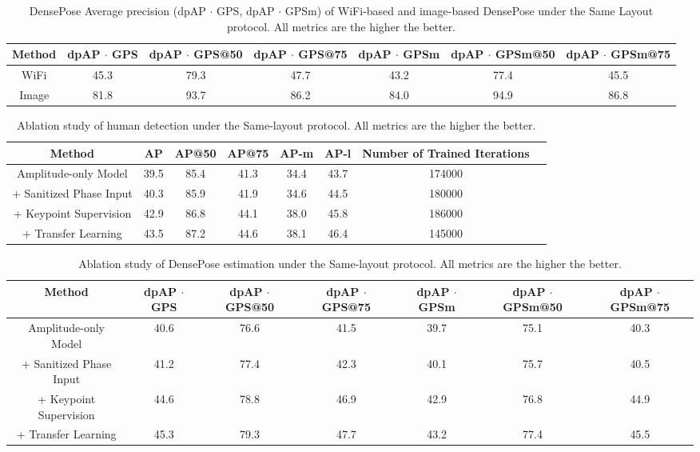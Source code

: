\documentclass[sigconf, anonymous=false]{acmart}
\begin{document}
\begin{table*}[!htb]
\begin{center}
\begin{tabular}{ |c|c|c|c|c|c|c| } 
 \hline
 Method & dpAP $\cdot$ GPS & dpAP $\cdot$ GPS@50 & dpAP $\cdot$ GPS@75 & dpAP $\cdot$ GPSm & dpAP $\cdot$ GPSm@50 & dpAP $\cdot$ GPSm@75 \\ 
 \hline
 WiFi &  45.3 & 79.3 & 47.7 & 43.2 & 77.4 & 45.5\\ \hline
 Image & 81.8 & 93.7 & 86.2 & 84.0 & 94.9 & 86.8\\
 \hline
\end{tabular}
\end{center}
\caption{DensePose Average precision (dpAP $\cdot$ GPS, dpAP $\cdot$ GPSm) of WiFi-based and image-based DensePose under the Same Layout protocol. All metrics are the higher the better.}
\label{tab:WiFi-Image-DP-AP}
\end{table*}

\begin{table*}[!htb]
\begin{center}
\begin{tabular}{ |c|c|c|c|c|c|c|c| } 
 \hline
 Method & AP & AP@50 & AP@75 & AP-m & AP-l & Number of Trained Iterations\\ 
 \hline
 Amplitude-only Model & 39.5 & 85.4 & 41.3 & 34.4 & 43.7 & 174000 \\
  \hline
 + Sanitized Phase Input & 40.3 & 85.9 & 41.9 & 34.6 & 44.5 & 180000 \\
 \hline
  + Keypoint Supervision & 42.9 & 86.8 & 44.1 &  38.0 & 45.8 & 186000 \\
 \hline
  + Transfer Learning & 43.5 & 87.2 & 44.6 & 38.1 & 46.4 & 145000\\ 
 \hline
\end{tabular}
\end{center}
\caption{Ablation study of human detection under the Same-layout protocol. All metrics are the higher the better.}
\label{tab:Ablation_1}
\end{table*}

\begin{table*}[!htb]
\begin{center}
\begin{tabular}{ |c|c|c|c|c|c|c| } 
 \hline
 Method & dpAP $\cdot$ GPS & dpAP $\cdot$ GPS@50 & dpAP $\cdot$ GPS@75 & dpAP $\cdot$ GPSm & dpAP $\cdot$ GPSm@50 & dpAP $\cdot$ GPSm@75\\ 
 \hline
 Amplitude-only Model & 40.6 & 76.6 & 41.5 & 39.7 & 75.1 & 40.3 \\
  \hline
 + Sanitized Phase Input & 41.2 & 77.4 & 42.3 & 40.1 & 75.7 & 40.5 \\
 \hline
  + Keypoint Supervision & 44.6 & 78.8 & 46.9 &  42.9 & 76.8 & 44.9 \\
 \hline
  + Transfer Learning & 45.3 & 79.3 & 47.7 & 43.2 & 77.4 & 45.5 \\ 
 \hline
\end{tabular}
\end{center}
\caption{Ablation study of DensePose estimation under the Same-layout protocol. All metrics are the higher the better.}
\label{tab:Ablation_2}
\end{table*}
\end{document}
